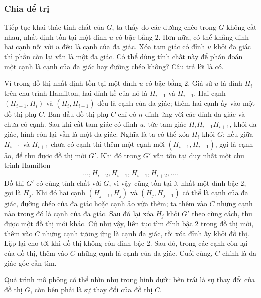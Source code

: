 \documentclass[11pt]{article}
\begin{document}
\subsubsection{Chia để trị}

Tiếp tục khai thác tính chất của \(G\), ta thấy do các đường chéo trong \(G\)
không cắt nhau, nhất định tồn tại một đỉnh \(u\) có bậc bằng \(2\). Hơn nữa,
có thể khẳng định hai cạnh nối với \(u\) đều là cạnh của đa giác. Xóa tam giác
có đỉnh \(u\) khỏi đa giác thì phần còn lại vẫn là một đa giác. Có thể dùng
tính chất này để phán đoán một cạnh là cạnh của đa giác hay đường chéo không?
Câu trả lời là có.

Vì trong đồ thị nhất định tồn tại một đỉnh \(u\) có bậc bằng \(2\). Giả sử
\(u\) là đỉnh \(H_i\) trên chu trình Hamilton, hai đỉnh kề của nó là
\(H_{i-1}\) và \(H_{i+1}\). Hai cạnh \((H_{i-1},H_i)\) và \((H_i,H_{i+1})\)
đều là cạnh của đa giác; thêm hai cạnh ấy vào một đồ thị phụ \(C\). Ban đầu
đồ thị phụ \(C\) chỉ có \(n\) đỉnh ứng với các đỉnh đa giác và chưa có cạnh.
Sau khi cắt tam giác có đỉnh \(u\), tức tam giác \(H_iH_{i-1}H_{i+1}\), khỏi
đa giác, hình còn lại vẫn là một đa giác. Nghĩa là ta có thể xóa \(H_i\) khỏi
\(G\); nếu giữa \(H_{i-1}\) và \(H_{i+1}\) chưa có cạnh thì thêm một cạnh mới
\((H_{i-1},H_{i+1})\), gọi là cạnh ảo, để thu được đồ thị mới \(G'\). Khi đó
trong \(G'\) vẫn tồn tại duy nhất một chu trình Hamilton
\[
  \ldots,H_{i-2},H_{i-1},H_{i+1},H_{i+2},\ldots .
\]
Đồ thị \(G'\) có cùng tính chất với \(G\), vì vậy cũng tồn tại ít nhất một đỉnh
bậc \(2\), gọi là \(H_j\). Khi đó hai cạnh \((H_{j-1},H_j)\) và
\((H_j,H_{j+1})\) có thể là cạnh của đa giác, đường chéo của đa giác hoặc cạnh
ảo vừa thêm; ta thêm vào \(C\) những cạnh nào trong đó là cạnh của đa giác. Sau
đó lại xóa \(H_j\) khỏi \(G'\) theo cùng cách, thu được một đồ thị mới khác.
Cứ như vậy, liên tục tìm đỉnh bậc \(2\) trong đồ thị mới, thêm vào \(C\) những
cạnh tương ứng là cạnh đa giác, rồi xóa đỉnh ấy khỏi đồ thị. Lặp lại cho tới
khi đồ thị không còn đỉnh bậc \(2\). Sau đó, trong các cạnh còn lại của đồ thị,
thêm vào \(C\) những cạnh là cạnh của đa giác. Cuối cùng, \(C\) chính là đa
giác gốc cần tìm.

Quá trình mô phỏng có thể nhìn như trong hình dưới: bên trái là sự thay đổi
của đồ thị \(G\), còn bên phải là sự thay đổi của đồ thị \(C\).
\end{document}
